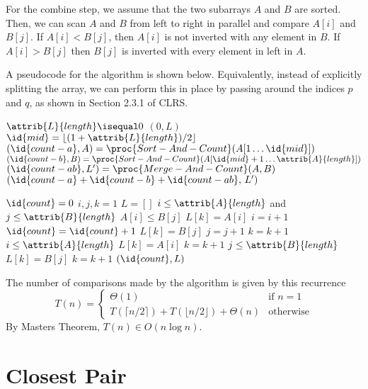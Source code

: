 For the combine step, we assume that the two subarrays $A$ and $B$ are sorted. Then, we can scan $A$ and $B$ from left to right in parallel and compare $A[i]$ and $B[j]$. If $A[i] < B[j]$, then $A[i]$ is not inverted with any element in $B$. If $A[i] > B[j]$ then $B[j]$ is inverted with every element in left in $A$.

A pseudocode for the algorithm is shown below. Equivalently, instead of explicitly splitting the array, we can perform this in place by passing around the indices $p$ and $q$, as shown in Section 2.3.1 of CLRS.

\begin{codebox}
    \li \If $\attrib{L}{length} \isequal 0$ \Then
        \li \Return $(0,L)$ 
        \End
    \li $\id{mid} = \lfloor (1 + \attrib{L}{length})/2  \rfloor$
    \li $(\id{count-a}, A) = \proc{Sort-And-Count}(A[1\ldots \id{mid}])$
    \li $(\id{count-b}, B) = \proc{Sort-And-Count}(A[\id{mid}+1 \ldots \attrib{A}{length}])$ 
    \li $(\id{count-ab}, L') = \proc{Merge-And-Count}(A,B)$
    \li \Return $(\id{count-a}+\id{count-b}+\id{count-ab}, \, L')$ 
\end{codebox}

\begin{codebox}
    \li $\id{count} = 0$
    \li $i,j,k = 1$ 
    \li $L = []$ 
    \li \While $i \leq \attrib{A}{length}$ and $j \leq \attrib{B}{length}$ \Do
        \li \If $A[i] \leq B[j]$ \Then
            \li $L[k] = A[i]$
            \li $i = i + 1$
        \li \Else
            \li $\id{count} = \id{count} + 1$
            \li $L[k] = B[j]$
            \li $j = j + 1$
            \End
        \li $k = k + 1$
        \End
    \li \While $i \leq \attrib{A}{length}$ \Do
        \li $L[k] = A[i]$
        \li $k = k + 1$
        \End
    \li \While $j \leq \attrib{B}{length}$ \Do
        \li $L[k] = B[j]$
        \li $k = k + 1$
        \End
    \li \Return $(\id{count}, L)$ 
\end{codebox}

The number of comparisons made by the algorithm is given by this recurrence
$$
T(n) =
\begin{cases}
    \Theta(1) & \text{if $n = 1$} \\
    T(\lceil n/2 \rceil) + T(\lfloor n/2 \rfloor) + \Theta(n) & \text{otherwise}
\end{cases}
$$
By Masters Theorem, $T(n) \in O(n \log n)$.

\section{Closest Pair}

